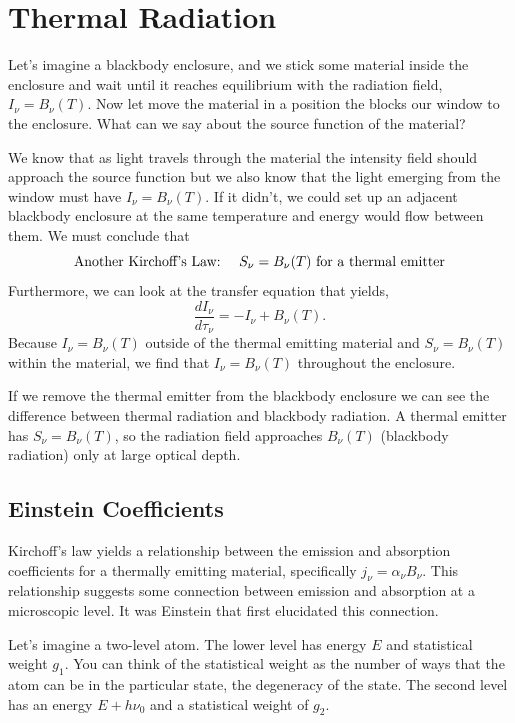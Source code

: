 \section{Thermal Radiation}
\label{sec:thermal-radiation}
Let's imagine a blackbody enclosure, and we stick some material inside
the enclosure and wait until it reaches equilibrium with the radiation
field, $I_\nu = B_\nu(T)$.  Now let move the material in a position
the blocks our window to the enclosure. What can we say about the
source function of the material?

We know that as light travels through the material the intensity field
should approach the source function but we also know that the light
emerging from the window must have $I_\nu=B_\nu(T)$.  If it didn't, we
could set up an adjacent blackbody enclosure at the same temperature
and energy would flow between them.  We must conclude that
\begin{equation}
\hbox{Another Kirchoff's Law:}~~~~S_\nu = B_\nu(T) \hbox{\rm ~for a thermal emitter}
\label{eq:66}
\end{equation}
Furthermore, we can look at the transfer equation that yields,
\begin{equation}
\frac{d I_\nu}{d \tau_\nu} = -I_\nu + B_\nu(T).
\label{eq:67}
\end{equation}
Because $I_\nu=B_\nu(T)$ outside of the thermal emitting material and 
$S_\nu=B_\nu(T)$ within the material, we find that $I_\nu=B_\nu(T)$
throughout the enclosure.

If we remove the thermal emitter from the blackbody enclosure we can
see the difference between thermal radiation and blackbody radiation.
A thermal emitter has $S_\nu = B_\nu(T)$, so the radiation field
approaches $B_\nu(T)$ (blackbody radiation) only at large optical
depth.

\subsection{Einstein Coefficients}
\label{sec:einst-coeff}

Kirchoff's law yields a relationship between the emission and absorption
coefficients for a thermally emitting material, specifically 
$j_\nu = \alpha_\nu B_\nu$.  This relationship suggests some
connection between emission and absorption at a microscopic level.  It
was Einstein that first elucidated this connection.

Let's imagine a two-level atom.  The lower level has energy $E$ and
statistical weight $g_1$.  You can think of the statistical weight as
the number of ways that the atom can be in the particular state, the
degeneracy of the state.  The second level has an energy $E+h\nu_0$
and a statistical weight of $g_2$.

